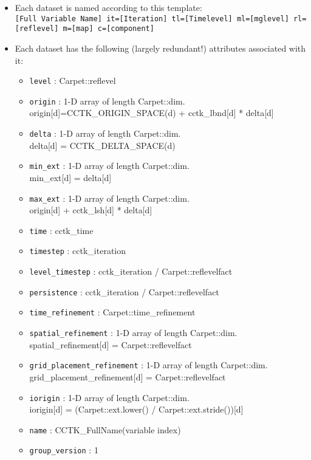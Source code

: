 \begin{itemize}
  \item Each dataset is named according to this template: \\
    {\tt \small [Full Variable Name] it=[Iteration] tl=[Timelevel] ml=[mglevel] rl=[reflevel] m=[map] c=[component]}
    
  \item Each dataset has the following (largely redundant!) attributes associated with it:

    \begin{itemize}
    \item {\tt level} : Carpet::reflevel
    \item {\tt origin} : 1-D array of length Carpet::dim. \\ origin[d]=CCTK\_ORIGIN\_SPACE(d) + 
      cctk\_lbnd[d] * delta[d]
    \item {\tt delta} : 1-D array of length Carpet::dim. \\ delta[d] = CCTK\_DELTA\_SPACE(d)
    \item {\tt min\_ext} : 1-D array of length Carpet::dim. \\ min\_ext[d] = delta[d] 
    \item {\tt max\_ext} : 1-D array of length Carpet::dim. \\ origin[d] + cctk\_lsh[d] * delta[d]
    \item {\tt time} : cctk\_time
    \item {\tt timestep} : cctk\_iteration
    \item {\tt level\_timestep} : cctk\_iteration / Carpet::reflevelfact
    \item {\tt persistence} : cctk\_iteration / Carpet::reflevelfact
    \item {\tt time\_refinement} : Carpet::time\_refinement
    \item {\tt spatial\_refinement} : 1-D array of length Carpet::dim. \\ spatial\_refinement[d] = Carpet::reflevelfact
    \item {\tt grid\_placement\_refinement} : 1-D array of length Carpet::dim. \\ grid\_placement\_refinement[d] = Carpet::reflevelfact
    \item {\tt iorigin} : 1-D array of length Carpet::dim. \\ iorigin[d] = (Carpet::ext.lower() / Carpet::ext.stride())[d]
    \item {\tt name} : CCTK\_FullName(variable index)
    \item {\tt group\_version} : 1

\end{itemize}
\end{itemize}
